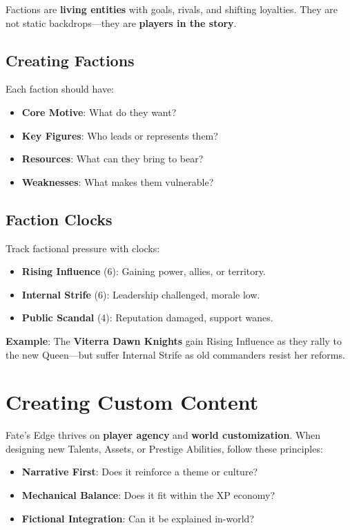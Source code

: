 Factions are \textbf{living entities} with goals, rivals, and shifting loyalties. They are not static backdrops---they are \textbf{players in the story}.

\subsection*{Creating Factions}

Each faction should have:

\begin{itemize}
    \item \textbf{Core Motive}: What do they want?
    \item \textbf{Key Figures}: Who leads or represents them?
    \item \textbf{Resources}: What can they bring to bear?
    \item \textbf{Weaknesses}: What makes them vulnerable?
\end{itemize}

\subsection*{Faction Clocks}

Track factional pressure with clocks:

\begin{itemize}
    \item \textbf{Rising Influence} (6): Gaining power, allies, or territory.
    \item \textbf{Internal Strife} (6): Leadership challenged, morale low.
    \item \textbf{Public Scandal} (4): Reputation damaged, support wanes.
\end{itemize}

\textbf{Example}: The \textbf{Viterra Dawn Knights} gain Rising Influence as they rally to the new Queen---but suffer Internal Strife as old commanders resist her reforms.

\section*{Creating Custom Content}

Fate's Edge thrives on \textbf{player agency} and \textbf{world customization}. When designing new Talents, Assets, or Prestige Abilities, follow these principles:

\begin{itemize}
    \item \textbf{Narrative First}: Does it reinforce a theme or culture?
    \item \textbf{Mechanical Balance}: Does it fit within the XP economy?
    \item \textbf{Fictional Integration}: Can it be explained in-world?
\end{itemize}

